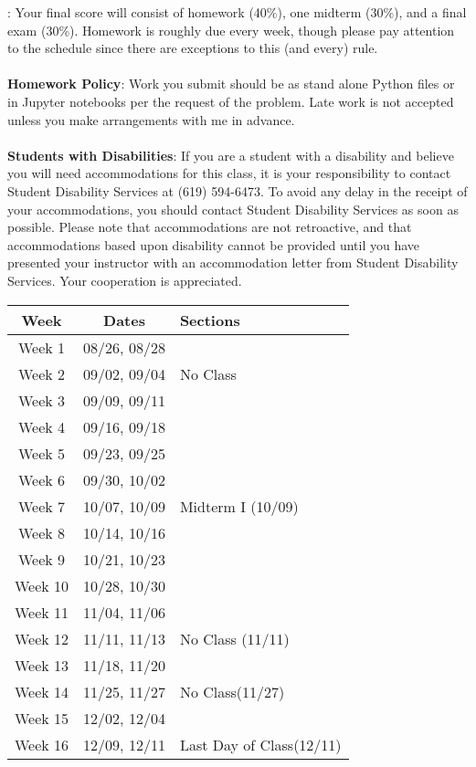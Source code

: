 \documentclass[a4paper,11pt]{article}
\begin{document}
: Your final score will consist of homework (40\%), one midterm (30\%), and a final exam (30\%).  Homework is roughly due every  week, though please pay attention to the schedule since there are exceptions to this (and every) rule.  \\
\\
{\bf Homework Policy}:  Work you submit should be as stand alone Python files or in Jupyter notebooks per the request of the problem.  Late work is not accepted unless you make arrangements with me in advance.\\  
\\
{\bf Students with Disabilities}: If you are a student with a disability and believe you will need accommodations for this class, it is your responsibility to contact Student Disability Services at (619) 594-6473. To avoid any delay in the receipt of your accommodations, you should contact Student Disability Services as soon as possible. Please note that accommodations are not retroactive, and that accommodations based upon disability cannot be provided until you have presented your instructor with an accommodation letter from Student Disability Services. Your cooperation is appreciated.\\
\pagebreak
\begin{center}
\begin{tabular}[]{cc|l}
Week & Dates & Sections \\
\hline
Week 1 & 08/26, 08/28 & \\
Week 2 & 09/02, 09/04 & No Class\\
Week 3 & 09/09, 09/11 & \\
Week 4 & 09/16, 09/18 & \\
Week 5 & 09/23, 09/25 & \\
Week 6 & 09/30, 10/02 & \\
Week 7 & 10/07, 10/09 & Midterm I (10/09)\\
Week 8 & 10/14, 10/16 & \\
Week 9 & 10/21, 10/23 & \\
Week 10 & 10/28, 10/30 & \\
Week 11 & 11/04, 11/06 & \\
Week 12 & 11/11, 11/13 & No Class (11/11)\\
Week 13 & 11/18, 11/20 & \\
Week 14 & 11/25, 11/27 & No Class(11/27)\\
Week 15 & 12/02, 12/04 & \\
Week 16 & 12/09, 12/11 & Last Day of Class(12/11)\\
\end{tabular}
\end{center}
\end{document}
